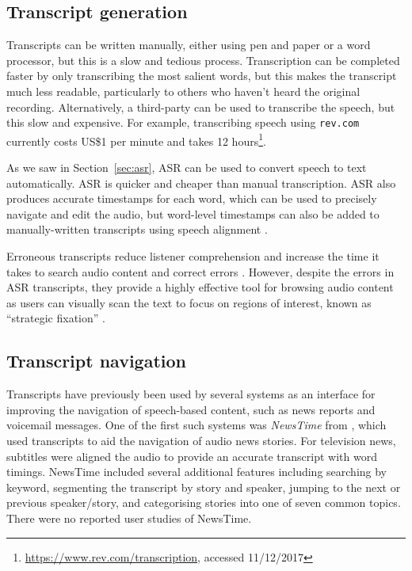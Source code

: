 \subsection{Transcript generation}\label{sec:transcript-generation}
Transcripts can be written manually, either using pen and paper or a word processor,
but this is a slow and tedious process. Transcription can be completed faster by only transcribing the most salient
words, but this makes the transcript much less readable, particularly to others who haven't heard the original
recording.  Alternatively, a third-party can be used to transcribe the speech, but this slow and expensive.  For
example, transcribing speech using \texttt{rev.com} currently costs US\$1 per minute and takes 12
hours\footnote{\url{https://www.rev.com/transcription}, accessed 11/12/2017}.

As we saw in Section~\ref{sec:asr}, ASR can be used to convert speech to text automatically.  ASR is quicker and
cheaper than manual transcription.  ASR also produces accurate timestamps for each word, which can be used to precisely
navigate and edit the audio, but word-level timestamps can also be added to manually-written transcripts using speech
alignment \citep{Griggs2007,Bohac2013}.

Erroneous transcripts reduce listener comprehension \citep{Stark2000,Vemuri2004} and increase the time it takes to
search audio content \citep{Ranjan2006} and correct errors \citep{Burke2006}.  However, despite the errors in ASR
transcripts, they provide a highly effective tool for browsing audio content as users can visually scan the text to
focus on regions of interest, known as ``strategic fixation'' \citep{Whittaker2007}.






\subsection{Transcript navigation}
Transcripts have previously been used by several systems as an interface for improving the navigation of speech-based
content, such as news reports and voicemail messages. 
One of the first such systems was \textit{NewsTime} from \citet{Horner1993}, which used transcripts to aid the
navigation of audio news stories.  For television news, subtitles were aligned the audio to provide an accurate 
transcript with word timings.  NewsTime included several additional features including searching by keyword, segmenting
the transcript by story and speaker, jumping to the next or previous speaker/story, and categorising stories into one
of seven common topics. There were no reported user studies of NewsTime.

